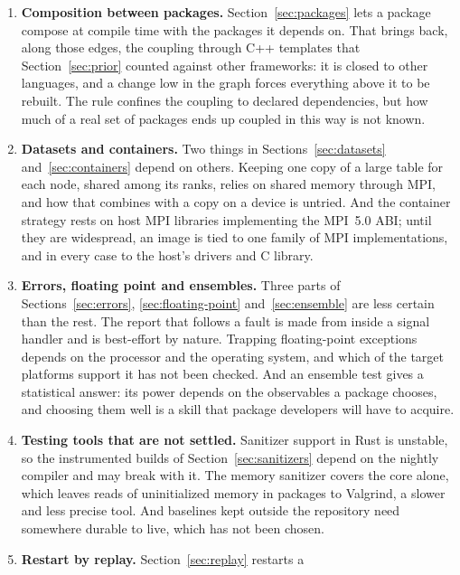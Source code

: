 \documentclass[11pt,a4paper]{article}
\begin{document}
\begin{enumerate}
        discretization.
  \item \textbf{Composition between packages.}  Section~\ref{sec:packages}
        lets a package compose at compile time with the packages it depends
        on.  That brings back, along those edges, the coupling through C++
        templates that Section~\ref{sec:prior} counted against other
        frameworks: it is closed to other languages, and a change low in the
        graph forces everything above it to be rebuilt.  The rule confines
        the coupling to declared dependencies, but how much of a real set of
        packages ends up coupled in this way is not known.
  \item \textbf{Datasets and containers.}  Two things in
        Sections~\ref{sec:datasets} and~\ref{sec:containers} depend on
        others.  Keeping one copy of a large table for each node, shared
        among its ranks, relies on shared memory through MPI, and how that
        combines with a copy on a device is untried.  And the container
        strategy rests on host MPI libraries implementing the MPI~5.0 ABI;
        until they are widespread, an image is tied to one family of MPI
        implementations, and in every case to the host's drivers and C
        library.
  \item \textbf{Errors, floating point and ensembles.}  Three parts of
        Sections~\ref{sec:errors}, \ref{sec:floating-point}
        and~\ref{sec:ensemble} are less certain than the rest.  The report
        that follows a fault is made from inside a signal handler and is
        best-effort by nature.  Trapping floating-point exceptions depends
        on the processor and the operating system, and which of the target
        platforms support it has not been checked.  And an ensemble test
        gives a statistical answer: its power depends on the observables a
        package chooses, and choosing them well is a skill that package
        developers will have to acquire.
  \item \textbf{Testing tools that are not settled.}  Sanitizer support in
        Rust is unstable, so the instrumented builds of
        Section~\ref{sec:sanitizers} depend on the nightly compiler and may
        break with it.  The memory sanitizer covers the core alone, which
        leaves reads of uninitialized memory in packages to Valgrind, a
        slower and less precise tool.  And baselines kept outside the
        repository need somewhere durable to live, which has not been
        chosen.
  \item \textbf{Restart by replay.}  Section~\ref{sec:replay} restarts a

\end{enumerate}
\end{document}
